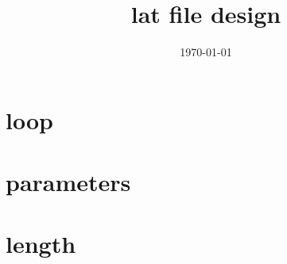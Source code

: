 \documentclass[10pt,CCT]{ctexart}
\begin{document}
\title{lat file design}
 \date{\today}%

\maketitle
\thispagestyle{empty}


 
\section{loop}



\section{parameters}



\section{length}
\end{document}
